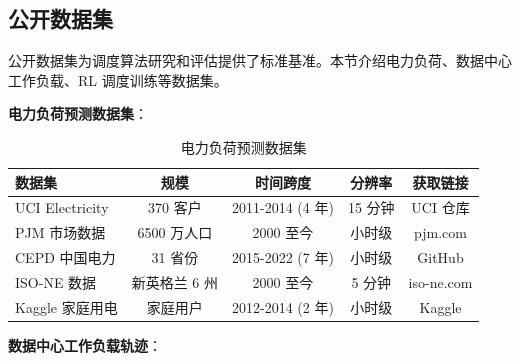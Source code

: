 \documentclass[12pt,a4paper]{article}
\begin{document}
\subsection{公开数据集}

公开数据集为调度算法研究和评估提供了标准基准。本节介绍电力负荷、数据中心工作负载、RL 调度训练等数据集。

\textbf{电力负荷预测数据集}：

\begin{table}[h]
\centering
\caption{电力负荷预测数据集}
\label{tab:power-datasets}
\begin{tabular}{@{}lcccc@{}}
\toprule
\textbf{数据集} & \textbf{规模} & \textbf{时间跨度} & \textbf{分辨率} & \textbf{获取链接} \\
\midrule
UCI Electricity & 370 客户 & 2011-2014 (4 年) & 15 分钟 & UCI 仓库 \\
PJM 市场数据 & 6500 万人口 & 2000 至今 & 小时级 & pjm.com \\
CEPD 中国电力 & 31 省份 & 2015-2022 (7 年) & 小时级 & GitHub \\
ISO-NE 数据 & 新英格兰 6 州 & 2000 至今 & 5 分钟 & iso-ne.com \\
Kaggle 家庭用电 & 家庭用户 & 2012-2014 (2 年) & 小时级 & Kaggle \\
\bottomrule
\end{tabular}
\end{table}

\textbf{数据中心工作负载轨迹}：
\end{document}
